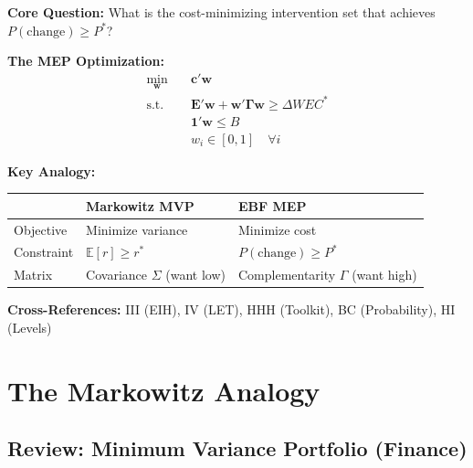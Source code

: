 
\begin{tcolorbox}[colback=blue!5!white, colframe=blue!75!black,
    title=Quick Reference: Minimum Effective Portfolio]

\textbf{Core Question:} What is the cost-minimizing intervention set that achieves
$P(\text{change}) \geq P^*$?

\textbf{The MEP Optimization:}
\begin{equation}
\boxed{
\begin{aligned}
\min_{\mathbf{w}} \quad & \mathbf{c}'\mathbf{w} \\
\text{s.t.} \quad & \mathbf{E}'\mathbf{w} + \mathbf{w}'\boldsymbol{\Gamma}\mathbf{w} \geq \Delta WEC^* \\
& \mathbf{1}'\mathbf{w} \leq B \\
& w_i \in [0, 1] \quad \forall i
\end{aligned}
}
\label{eq:mep-optimization}
\end{equation}

\textbf{Key Analogy:}
\begin{center}
\begin{tabular}{@{}lll@{}}
\toprule
& \textbf{Markowitz MVP} & \textbf{EBF MEP} \\
\midrule
Objective & Minimize variance & Minimize cost \\
Constraint & $\mathbb{E}[r] \geq r^*$ & $P(\text{change}) \geq P^*$ \\
Matrix & Covariance $\Sigma$ (want low) & Complementarity $\Gamma$ (want high) \\
\bottomrule
\end{tabular}
\end{center}

\textbf{Cross-References:} III (EIH), IV (LET), HHH (Toolkit), BC (Probability), HI (Levels)
\end{tcolorbox}


\section{The Markowitz Analogy}
\label{sec:mep-analogy}

\subsection{Review: Minimum Variance Portfolio (Finance)}

